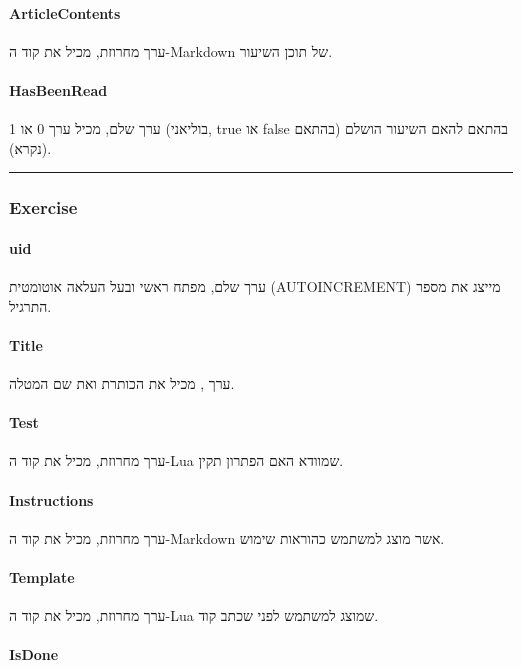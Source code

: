 \paragraph{ArticleContents}

ערך מחרוזת, מכיל את קוד ה-Markdown של תוכן השיעור.

\paragraph{HasBeenRead}

ערך שלם, מכיל ערך 0 או 1 (בוליאני, true או false בהתאם) בהתאם להאם השיעור הושלם (נקרא).

\noindent\rule{\textwidth}{0.4pt}

\subsubsection*{Exercise}
\paragraph{uid}

ערך שלם, מפתח ראשי ובעל העלאה אוטומטית (AUTOINCREMENT) מייצג את מספר התרגיל.

\paragraph{Title}

ערך , מכיל את הכותרת ואת שם המטלה.

\paragraph{Test}

ערך מחרוזת, מכיל את קוד ה-Lua שמוודא האם הפתרון תקין.

\paragraph{Instructions}

ערך מחרוזת, מכיל את קוד ה-Markdown אשר מוצג למשתמש כהוראות שימוש.

\paragraph{Template}

ערך מחרוזת, מכיל את קוד ה-Lua שמוצג למשתמש לפני שכתב קוד.

\paragraph{IsDone}

